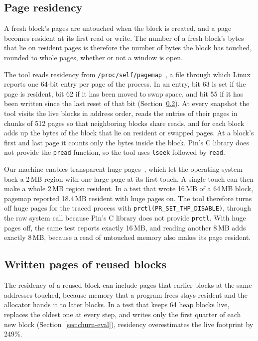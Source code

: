 \documentclass[11pt]{article}
\newcommand{\secref}[1]{Section~\ref{#1}}
\begin{document}
\subsection{Page residency}
\label{sec:residency}

A fresh block's pages are untouched when the block is created, and a page becomes resident at its first read or write. The number of a fresh block's bytes that lie on resident pages is therefore the number of bytes the block has touched, rounded to whole pages, whether or not a window is open.

The tool reads residency from \texttt{/proc/self/pagemap}~\cite{pagemap}, a file through which Linux reports one 64-bit entry per page of the process. In an entry, bit 63 is set if the page is resident, bit 62 if it has been moved to swap space, and bit 55 if it has been written since the last reset of that bit (\secref{sec:written}). At every snapshot the tool visits the live blocks in address order, reads the entries of their pages in chunks of 512 pages so that neighboring blocks share reads, and for each block adds up the bytes of the block that lie on resident or swapped pages. At a block's first and last page it counts only the bytes inside the block. Pin's C library does not provide the \texttt{pread} function, so the tool uses \texttt{lseek} followed by \texttt{read}.

Our machine enables transparent huge pages~\cite{thp}, which let the operating system back a 2\,MB region with one large page at its first touch. A single touch can then make a whole 2\,MB region resident. In a test that wrote 16\,MB of a 64\,MB block, pagemap reported 18.4\,MB resident with huge pages on. The tool therefore turns off huge pages for the traced process with \texttt{prctl(PR\_SET\_THP\_DISABLE)}, through the raw system call because Pin's C library does not provide \texttt{prctl}. With huge pages off, the same test reports exactly 16\,MB, and reading another 8\,MB adds exactly 8\,MB, because a read of untouched memory also makes its page resident.

\subsection{Written pages of reused blocks}
\label{sec:written}

The residency of a reused block can include pages that earlier blocks at the same addresses touched, because memory that a program frees stays resident and the allocator hands it to later blocks. In a test that keeps 64 heap blocks live, replaces the oldest one at every step, and writes only the first quarter of each new block (\secref{sec:churn-eval}), residency overestimates the live footprint by 249\%.
\end{document}
